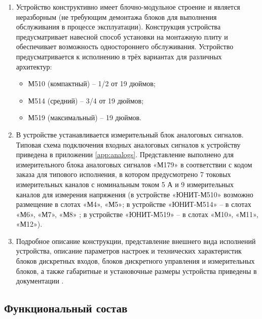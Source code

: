 \begin{enumerate}[label=\arabic{section}.\arabic{subsection}.\arabic*, labelsep=4pt, leftmargin=0pt, itemindent=57pt]

\item
Устройство конструктивно имеет блочно-модульное строение и является неразборным (не требующим демонтажа блоков для выполнения обслуживания в процессе эксплуатации). 
Конструкция устройства предусматривает навесной способ установки на монтажную плиту и обеспечивает возможность одностороннего обслуживания.
Устройство предусматривается к исполнению в трёх вариантах для различных архитектур:
\begin{itemize}
\item М510 (компактный) – 1/2 от 19 дюймов;
\item М514 (средний) – 3/4 от 19 дюймов;
\item М519 (максимальный) – 19 дюймов.
\end{itemize}

\item
В устройстве устанавливается измерительный блок аналоговых сигналов. Типовая схема подключения входных аналоговых сигналов к устройству приведена в приложении \ref{app:analogs}. Представление выполнено для измерительного блока аналоговых сигналов «М179» в соответствии с кодом заказа для типового исполнения, в котором предусмотрено 7 токовых измерительных каналов с номинальным током 5 А и 9 измерительных каналов для измерения напряжения (в устройстве «ЮНИТ-М510» возможно размещение в слотах «М4», «М5»; в устройстве «ЮНИТ-М514» -- в слотах «М6», «М7», «М8» ; в устройстве «ЮНИТ-М519» -- в слотах «М10», «М11», «М12»).

\item
Подробное описание конструкции, представление внешнего вида исполнений устройства, описание параметров настроек и технических характеристик блоков дискретных входов, блоков дискретного управления и измерительных блоков, а также габаритные и установочные размеры устройства приведены в документации \ManualUnitGeneral.

\end{enumerate}

\color{unidarkgreen}\subsection{Функциональный состав}
\color{black}

